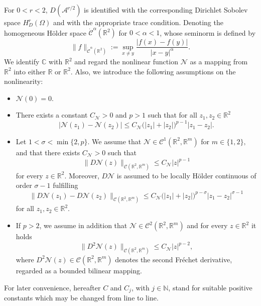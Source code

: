 \documentclass[10pt,a4paper]{amsart}
\newcommand{\N}{\mathbb{N}}
\numberwithin{equation}{section}
\begin{document}
For \(0<r<2\), \(D(\mathcal{A}^{r/2})\) is identified with the corresponding Dirichlet Sobolev space \(H^r_D(\Omega)\) and with the appropriate trace condition. Denoting the homogeneous H\"older space $\dot{\mathcal{C}}^\alpha(\mathbb R^2)$ for $0<\alpha<1$, whose seminorm is defined by
$$
\|f\|_{\dot{\mathcal{C}}^\alpha(\mathbb R^2)}
:=
\sup_{x\neq y}
\frac{|f(x)-f(y)|}
{|x-y|^\alpha}.
$$
We identify \(\mathbb C\) with \(\mathbb R^2\) and regard the nonlinear function \(\mathcal N\) as a mapping from \(\mathbb R^2\) into either
\(\mathbb R\) or \(\mathbb R^2\). Also, we introduce the following assumptions on the nonlinearity:

\begin{itemize}

\item $\mathcal N(0)=0$.

\item There exists a constant \(C_{\mathcal N}>0\) and \(p>1\) such that for all \(z_1,z_2\in\mathbb R^2\)
\begin{equation}
\label{eq:N-Lip}
|\mathcal N(z_1)-\mathcal N(z_2)|
\le
C_{\mathcal N}
\bigl(|z_1|+|z_2|\bigr)^{p-1}
|z_1-z_2|.
\end{equation}

\item Let \(1<\sigma<\min\{2,p\}\). We assume that $
\mathcal N\in \mathcal C^1(\mathbb R^2,\mathbb R^m)$ for $m\in\{1,2\},
$
and that there exists \(C_{\mathcal N}>0\) such that
\begin{equation}
\label{eq:DN-growth}
\big\|D\mathcal N(z)\big\|_{\mathcal C(\mathbb R^2,\mathbb R^m)}
\le
C_{\mathcal N}|z|^{p-1}
\end{equation}
for every \(z\in\mathbb R^2\). Moreover, \(D\mathcal N\) is assumed to be locally H\"older continuous
of order \(\sigma-1\) fulfilling
\begin{equation*}
\big\|D\mathcal N(z_1)-D\mathcal N(z_2)\big\|_{\mathcal C(\mathbb R^2,\mathbb R^m)}
\le
C_{\mathcal N}
\bigl(|z_1|+|z_2|\bigr)^{p-\sigma}
|z_1-z_2|^{\sigma-1}
\end{equation*}
for all \(z_1,z_2\in\mathbb R^2\).

\item If \(p>2\), we assume in addition that $\mathcal N\in \mathcal C^2(\mathbb R^2,\mathbb R^m)$
and for every \(z\in\mathbb R^2\) it holds
\begin{equation}
\label{eq:D2N-growth}
\big\|D^2\mathcal N(z)\big\|_{\mathcal C(\mathbb R^2,\mathbb R^m)}
\le
C_{\mathcal N}|z|^{p-2},
\end{equation}
where $D^2\mathcal N(z)\in
\mathcal C(\mathbb R^2,\mathbb R^m)$ denotes the second Fr\'echet derivative, regarded as a bounded bilinear mapping.
\end{itemize}
For later convenience, hereafter $C$ and $C_j$, with $j\in\N$, stand for suitable positive constants which may be changed from line to line.
\end{document}
